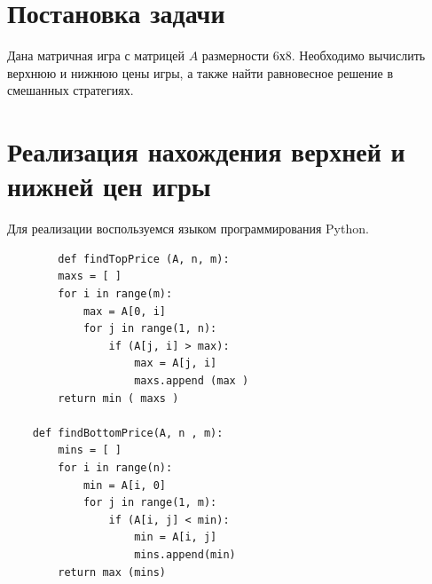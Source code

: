 \documentclass[14pt, titlepage,fleqn]{extarticle}
\begin{document}
	

	
	
	\newpage
	
 
	\clearpage
	\section*{Постановка задачи}
	Дана матричная игра с матрицей $A$ размерности 6х8. Необходимо вычислить верхнюю и нижнюю цены игры, а также найти равновесное решение в смешанных стратегиях.
	\section*{Реализация нахождения верхней и нижней цен игры}
	Для реализации воспользуемся языком программирования Python.
	\begin{lstlisting}
		def findTopPrice (A, n, m):
		maxs = [ ]
		for i in range(m):
			max = A[0, i]
			for j in range(1, n):
				if (A[j, i] > max):
					max = A[j, i]
					maxs.append (max )
		return min ( maxs )
	
	def findBottomPrice(A, n , m):
		mins = [ ]
		for i in range(n):
			min = A[i, 0]
			for j in range(1, m):
				if (A[i, j] < min):
					min = A[i, j]
					mins.append(min)
		return max (mins)	
	\end{lstlisting}
\end{document}
